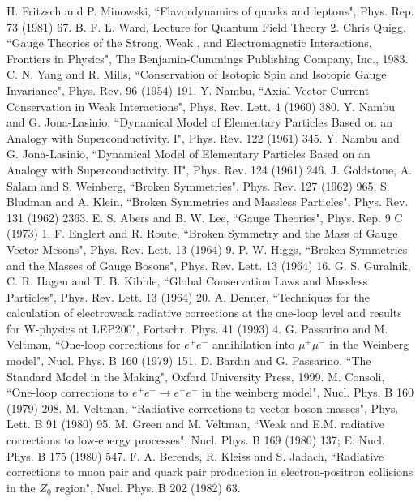 \documentclass
[
]
{thesis}
\begin{document}
\begin{thebibliography}{widestlabel}
	 H. Fritzsch and P. Minowski, ``Flavordynamics of quarks and leptons", Phys. Rep. 73 (1981) 67.	
	 B. F. L. Ward, Lecture for Quantum Field Theory 2.
	 Chris Quigg, ``Gauge Theories of the Strong, Weak , and Electromagnetic Interactions, Frontiers in Physics", The Benjamin-Cummings Publishing Company, Inc., 1983.
	 C. N. Yang and R. Mills, ``Conservation of Isotopic Spin and Isotopic Gauge Invariance", Phys. Rev. 96 (1954) 191.
	 Y. Nambu, ``Axial Vector Current Conservation in Weak Interactions", Phys. Rev. Lett. 4 (1960) 380.
	 Y. Nambu and G. Jona-Lasinio, ``Dynamical Model of Elementary Particles Based on an Analogy with Superconductivity. I", Phys. Rev. 122 (1961) 345.
	 Y. Nambu and G. Jona-Lasinio, ``Dynamical Model of Elementary Particles Based on an Analogy with Superconductivity. II", Phys. Rev. 124 (1961) 246.
	 J. Goldstone, A. Salam and S. Weinberg, ``Broken Symmetries", Phys. Rev. 127 (1962) 965.
	 S. Bludman and A. Klein, ``Broken Symmetries and Massless Particles", Phys. Rev. 131 (1962) 2363.
	 E. S. Abers and B. W. Lee, ``Gauge Theories", Phys. Rep. 9 C (1973) 1.
	 F. Englert and R. Route, ``Broken Symmetry and the Mass of Gauge Vector Mesons", Phys. Rev. Lett. 13 (1964) 9.
	 P. W. Higgs, ``Broken Symmetries and the Masses of Gauge Bosons", Phys. Rev. Lett. 13 (1964) 16.
	 G. S. Guralnik, C. R. Hagen and T. B. Kibble, ``Global Conservation Laws and Massless Particles", Phys. Rev. Lett. 13 (1964) 20.
	 A. Denner, ``Techniques for the calculation of electroweak radiative corrections at the one-loop level and results for W-physics at LEP200", Fortschr. Phys. 41 (1993) 4.
	 G. Passarino and M. Veltman, ``One-loop corrections for $e^+e^-$ annihilation into $\mu^+\mu^-$ in the Weinberg model", Nucl. Phys. B 160 (1979) 151.
	 D. Bardin and G. Passarino, ``The Standard Model in the Making", Oxford University Press, 1999.
	 M. Consoli, ``One-loop corrections to $e^+e^-\to e^+e^-$ in the weinberg model", Nucl. Phys. B 160 (1979) 208.
	 M. Veltman, ``Radiative corrections to vector boson masses", Phys. Lett. B 91 (1980) 95.
	 M. Green and M. Veltman, ``Weak and E.M. radiative corrections to low-energy processes", Nucl. Phys. B 169 (1980) 137; E: Nucl. Phys. B 175 (1980) 547.
	 F. A. Berends, R. Kleiss and S. Jadach, ``Radiative corrections to muon pair and quark pair production in electron-positron collisions in the $Z_0$ region", Nucl. Phys. B 202 (1982) 63.

\end{thebibliography}
\end{document}
